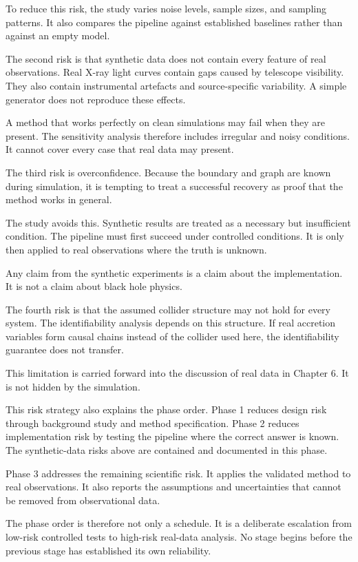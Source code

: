 To reduce this risk, the study varies noise levels, sample sizes, and sampling
patterns. It also compares the pipeline against established baselines rather than
against an empty model.

The second risk is that synthetic data does not contain every feature of real
observations. Real X-ray light curves contain gaps caused by telescope visibility.
They also contain instrumental artefacts and source-specific variability. A simple
generator does not reproduce these effects.

A method that works perfectly on clean simulations may fail when they are present.
The sensitivity analysis therefore includes irregular and noisy conditions. It cannot
cover every case that real data may present.

The third risk is overconfidence. Because the boundary and graph are known during
simulation, it is tempting to treat a successful recovery as proof that the method
works in general.

The study avoids this. Synthetic results are treated as a necessary but insufficient
condition. The pipeline must first succeed under controlled conditions. It is only
then applied to real observations where the truth is unknown.

Any claim from the synthetic experiments is a claim about the implementation. It is
not a claim about black hole physics.

The fourth risk is that the assumed collider structure may not hold for every
system. The identifiability analysis depends on this structure. If real accretion
variables form causal chains instead of the collider used here, the identifiability
guarantee does not transfer.

This limitation is carried forward into the discussion of real data in Chapter 6. It
is not hidden by the simulation.

This risk strategy also explains the phase order. Phase 1 reduces design risk through
background study and method specification. Phase 2 reduces implementation risk by
testing the pipeline where the correct answer is known. The synthetic-data risks
above are contained and documented in this phase.

Phase 3 addresses the remaining scientific risk. It applies the validated method to
real observations. It also reports the assumptions and uncertainties that cannot be
removed from observational data.

The phase order is therefore not only a schedule. It is a deliberate escalation from
low-risk controlled tests to high-risk real-data analysis. No stage begins before the
previous stage has established its own reliability.

